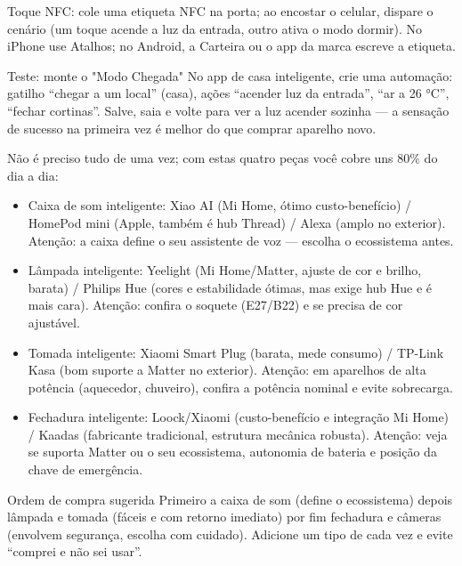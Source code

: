 Toque NFC: cole uma etiqueta NFC na porta; ao encostar o celular, dispare o cenário (um toque acende a luz da entrada, outro ativa o modo dormir). No iPhone use Atalhos; no Android, a Carteira ou o app da marca escreve a etiqueta.

\begin{tcbpractice}{Teste: monte o "Modo Chegada"}
No app de casa inteligente, crie uma automação: gatilho “chegar a um local” (casa), ações “acender luz da entrada”, “ar a 26 °C”, “fechar cortinas”. Salve, saia e volte para ver a luz acender sozinha — a sensação de sucesso na primeira vez é melhor do que comprar aparelho novo.

\end{tcbpractice}


Não é preciso tudo de uma vez; com estas quatro peças você cobre uns 80\% do dia a dia:

\begin{itemize}
  \item Caixa de som inteligente: Xiao AI (Mi Home, ótimo custo-benefício) / HomePod mini (Apple, também é hub Thread) / Alexa (amplo no exterior). Atenção: a caixa define o seu assistente de voz — escolha o ecossistema antes.
  \item Lâmpada inteligente: Yeelight (Mi Home/Matter, ajuste de cor e brilho, barata) / Philips Hue (cores e estabilidade ótimas, mas exige hub Hue e é mais cara). Atenção: confira o soquete (E27/B22) e se precisa de cor ajustável.
  \item Tomada inteligente: Xiaomi Smart Plug (barata, mede consumo) / TP-Link Kasa (bom suporte a Matter no exterior). Atenção: em aparelhos de alta potência (aquecedor, chuveiro), confira a potência nominal e evite sobrecarga.
  \item Fechadura inteligente: Loock/Xiaomi (custo-benefício e integração Mi Home) / Kaadas (fabricante tradicional, estrutura mecânica robusta). Atenção: veja se suporta Matter ou o seu ecossistema, autonomia de bateria e posição da chave de emergência.
\end{itemize}

\begin{tcbinfo}{Ordem de compra sugerida}
Primeiro a caixa de som (define o ecossistema) depois lâmpada e tomada (fáceis e com retorno imediato) por fim fechadura e câmeras (envolvem segurança, escolha com cuidado). Adicione um tipo de cada vez e evite “comprei e não sei usar”.

\end{tcbinfo}


